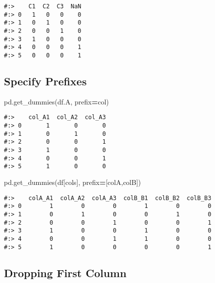 \documentclass[
]{book}
\newenvironment{Shaded}{\begin{snugshade}}{\end{snugshade}}
\newcommand{\NormalTok}[1]{#1}
\newcommand{\OperatorTok}[1]{\textcolor[rgb]{0.43,0.43,0.43}{\textbf{#1}}}
\newcommand{\StringTok}[1]{\textcolor[rgb]{0.5,0.5,0.5}{#1}}
\begin{document}
\begin{verbatim}
#:>    C1  C2  C3  NaN
#:> 0   1   0   0    0
#:> 1   0   1   0    0
#:> 2   0   0   1    0
#:> 3   1   0   0    0
#:> 4   0   0   0    1
#:> 5   0   0   0    1
\end{verbatim}

\hypertarget{specify-prefixes}{%
\subsection{Specify Prefixes}\label{specify-prefixes}}

\begin{Shaded}
\begin{Highlighting}[]
\NormalTok{pd.get\_dummies(df.A, prefix}\OperatorTok{=}\StringTok{\textquotesingle{}col\textquotesingle{}}\NormalTok{)}
\end{Highlighting}
\end{Shaded}

\begin{verbatim}
#:>    col_A1  col_A2  col_A3
#:> 0       1       0       0
#:> 1       0       1       0
#:> 2       0       0       1
#:> 3       1       0       0
#:> 4       0       0       1
#:> 5       1       0       0
\end{verbatim}

\begin{Shaded}
\begin{Highlighting}[]
\NormalTok{pd.get\_dummies(df[cols], prefix}\OperatorTok{=}\NormalTok{[}\StringTok{\textquotesingle{}colA\textquotesingle{}}\NormalTok{,}\StringTok{\textquotesingle{}colB\textquotesingle{}}\NormalTok{])}
\end{Highlighting}
\end{Shaded}

\begin{verbatim}
#:>    colA_A1  colA_A2  colA_A3  colB_B1  colB_B2  colB_B3
#:> 0        1        0        0        1        0        0
#:> 1        0        1        0        0        1        0
#:> 2        0        0        1        0        0        1
#:> 3        1        0        0        1        0        0
#:> 4        0        0        1        1        0        0
#:> 5        1        0        0        0        0        1
\end{verbatim}

\hypertarget{dropping-first-column}{%
\subsection{Dropping First Column}\label{dropping-first-column}}
\end{document}
